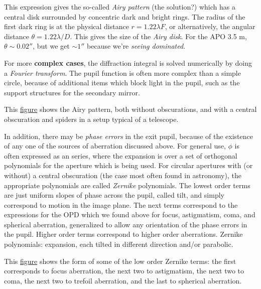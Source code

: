 \documentclass[12pt]{article}
\newcommand{\mynotes}[1]{\textcolor{myBlue}{#1}}
\begin{document}
This expression gives the so-called \textit{Airy pattern} (the solution?)
which has a central disk surrounded by concentric dark and bright rings.
The radius of the first dark ring is at the physical distance
$r = 1.22\lambda F$, or alternatively, the angular distance
$\theta = 1.22\lambda/D$. This gives the size of the \textit{Airy disk}.
\mynotes{For the APO 3.5 m, $\theta \sim 0.02''$, but we get $\sim 1''$
because we're \textit{seeing dominated}.}

For more \textbf{complex cases}, the diffraction integral is solved
numerically by doing a \textit{Fourier transform}. The pupil function is often
more complex than a simple circle, because of additional
items which block light in the pupil, such as the support structures
for the secondary mirror.

This \href{http://astronomy.nmsu.edu/holtz/a535/html/diagrams/a535/airy.htm}
{figure} shows the Airy pattern, both without obscurations,
and with a central obscuration and spiders in a setup typical of a telescope.

In addition, there may be \textit{phase errors} in the exit pupil, because of
the existence of any one of the sources of aberration discussed
above. For general use, $\phi$ is often expressed as an series,
where the expansion is over a set of orthogonal polynomials for the
aperture which is being used. For circular apertures with (or
without) a central obscuration (the case most often found in
astronomy), the appropriate polynomials are called \textit{Zernike}
polynomials. The lowest order terms are just uniform slopes of phase
across the pupil, called tilt, and simply correspond to motion in the
image plane. The next terms correspond to the expressions for the OPD
which we found above for focus, astigmatism, coma, and spherical
aberration, generalized to allow any orientation of the phase errors
in the pupil. Higher order terms correspond to higher order
aberrations. \mynotes{Zernike polynomials: expansion, each tilted in
different direction and/or parabolic}.

This \href{http://astronomy.nmsu.edu/holtz/a535/html/diagrams/a535/zernike.htm}
{figure} shows the form of some of the low order Zernike terms:
the first corresponds to focus aberration, the next two to
astigmatism, the next two to coma, the next two to trefoil
aberration, and the last to spherical aberration.
\end{document}
